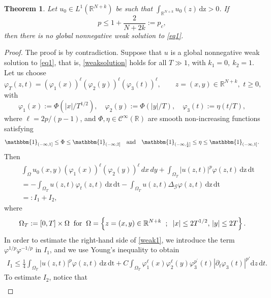 \documentclass[reqno,11pt]{amsart}
\newtheorem{theorem}{Theorem}[section]
\numberwithin{equation}{section}
\def\R{{\mathbb {R}}}
\newcommand{\abs}[1]{\lvert#1\rvert}
\def\R{\mathbb{R}}
\begin{document}
\begin{theorem}\label{T1}
	Let $u_0\in L^1(\R^{N+k})$ be such that $\displaystyle \int_{\R^{N+k}}u_0(z)\,\mathrm{dz}>0$. If
	$$
	p\leq1+\frac{2}{N+2k}:=p_c,
	$$
	then there is no global nonnegative weak solution to \eqref{eq1}.
\end{theorem}
\begin{proof} The proof is by contradiction. Suppose that $u$ is a global nonnegative weak
	solution to \eqref{eq1}, that is, \eqref{weaksolution} holds for all $T\gg1$, with $k_1=0,\ k_2=1$. Let us choose 
	$$\varphi_	T(z,t)=\left(\varphi_1(x)\right)^\ell \left(\varphi_2(y)\right)^\ell\left(\varphi_3(t)\right)^\ell,\qquad z=(x,y)\in\mathbb{R}^{N+k},\,\,t\geq 0,$$
	with
	$$\varphi_1(x):=\Phi\left(\abs{x}/T^{1/2}\right),\quad \varphi_2(y):=\Phi\left(\abs{y}/T\right),\quad \varphi_3(t):=\eta\left(t/T\right),$$
	where $\ell= 2p/(p-1)$,  and $\Phi,\eta\in \mathcal{C}^\infty(\mathbb{R})$ are smooth non-increasing functions 
	satisfying 
	$$\mathbbm{1}_{(-\infty,1]} \leq \Phi\leq \mathbbm{1}_{(-\infty,2]}\quad\hbox{and}\quad \mathbbm{1}_{(-\infty,\frac{1}{2}]} \leq \eta\leq \mathbbm{1}_{(-\infty,1]}.$$
	Then
	\begin{eqnarray}\label{weak1}
		&{}&\int_{\Omega}u_0(x,y)\left(\varphi_1(x)\right)^\ell \left(\varphi_2(y)\right)^\ell\,dx\,dy+\int_{\Omega_T}|u(z,t)|^{p}\varphi(z,t)\,\mathrm{dz}\,\mathrm{dt}\nonumber\\
		&{}&=-\int_{\Omega_T}u(z,t)\varphi_t(z,t)\,\mathrm{dz}\,\mathrm{dt} -\int_{\Omega_T}u(z,t)\Delta_{\mathcal{G}}\varphi(z,t)\,\mathrm{dz}\,\mathrm{dt}\nonumber\\
		&{}&=: I_1+I_2,
	\end{eqnarray}
	where
	\[
	\Omega_T:=[0,T]\times\Omega\;\;\text{for}\;\; \Omega=\left\{ z=(x,y)\in{\mathbb{R}}^{N+k}\hspace{2
		mm};\hspace{2mm}|x|\leq 2 T^{1/2},\,|y|\leq 2 T\right\}.
	\]
	\noindent In order to estimate the right-hand side of \eqref{weak1}, we introduce the term 
	$\varphi^{1/p}\varphi^{-1/p}$ in $I_1$, and we use Young's inequality to obtain
	\begin{align}\label{I1}
		I_1\leqslant\frac{1}{4} \int_{\Omega_T}|u(z,t)|^{p}\varphi(z,t)\,\mathrm{dz}\,\mathrm{dt}+C\int_{\Omega_T}\varphi_1^\ell(x)\varphi_2^\ell(y)\varphi_3^{p^\prime}(t)\left|\partial_t \varphi_3(t)\right|^{p'}\mathrm{d}z\,\mathrm{d}t.
	\end{align}
	To estimate $I_2$,  notice that 
	\begin{align}\label{IneqA}

\end{align}
\end{proof}
\end{document}
